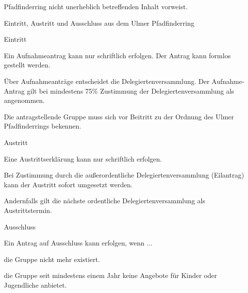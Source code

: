 \begin{legal}
\begin{legal}
\begin{legal}
                            Pfadfinderring nicht unerheblich betreffenden Inhalt vorweist.
                  \end{legal}
        \end{legal}
    \item Eintritt, Austritt und Ausschluss aus dem Ulmer Pfadfinderring
        \begin{legal}
            \item Eintritt
                \begin{legal}
                    \item Ein Aufnahmeantrag kann nur schriftlich erfolgen.
                          Der Antrag kann formlos gestellt werden.
                    \item Über Aufnahmeanträge entscheidet die Delegiertenversammlung.
                          Der Aufnahme-Antrag gilt bei mindestens 75\% Zustimmung 
                          der Delegiertenversammlung als angenommen.
                    \item Die antragstellende Gruppe muss sich vor Beitritt zu der Ordnung des 
                          Ulmer Pfadfinderrings bekennen.
                \end{legal}
            \item Austritt
                \begin{legal}
                    \item Eine Austrittserklärung kann nur schriftlich erfolgen.
                    \item Bei Zustimmung durch die außerordentliche Delegiertenversammlung 
                          (Eilantrag) kann der Austritt sofort umgesetzt werden.
                    \item Andernfalls gilt die nächste ordentliche Delegiertenversammlung als 
                          Austrittstermin.
                \end{legal}
            \item Ausschluss
                \begin{legal}
                    \item Ein Antrag auf Ausschluss kann erfolgen, wenn ...
                        \begin{legal}
                            \item die Gruppe nicht mehr existiert.
                            \item die Gruppe seit mindestens einem Jahr keine Angebote für Kinder 
                                  oder Jugendliche anbietet.

\end{legal}
\end{legal}
\end{legal}
\end{legal}
